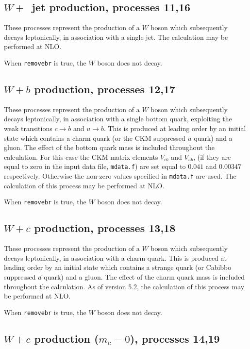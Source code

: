 \subsection{$W+$~jet production, processes 11,16}
\label{subsec:w1jet}

These processes represent the production of a $W$ boson which subsequently
decays leptonically, in association with a single jet.
The calculation may be performed at NLO.

When {\tt removebr} is true, the $W$ boson does not decay.

\subsection{$W+b$ production, processes 12,17}
\label{subsec:wb}

These processes represent the production of a $W$ boson which
subsequently decays leptonically, in association with a single bottom
quark, exploiting the weak transitions $c \to b$ and $u \to b$.
This is produced at leading order by an initial state which
contains a charm quark (or the CKM  suppressed $u$ quark) and a
gluon.  The effect of the bottom quark mass is included throughout the
calculation.  
For this case the CKM matrix elements $V_{cb}$ and $V_{ub}$,
(if they are equal to zero in the input data file, {\tt mdata.f})
are set equal to $0.041$ and $0.00347$ respectively. 
Otherwise the non-zero values specified in {\tt mdata.f} are used. 
The calculation of this process may
be performed at NLO.

When {\tt removebr} is true, the $W$ boson does not decay.

\subsection{$W+c$ production, processes 13,18}
\label{subsec:wc}

These processes represent the production of a $W$ boson which
subsequently decays leptonically, in association with a charm
quark. This is produced at leading order by an initial state which
contains a strange quark (or Cabibbo suppressed $d$ quark) and a
gluon.  The effect of the charm quark mass is included throughout the
calculation.  As of version 5.2, the calculation of this process may
be performed at NLO.

When {\tt removebr} is true, the $W$ boson does not decay.

\subsection{$W+c$ production ($m_c=0$), processes 14,19}
\label{subsec:wcmassless}

